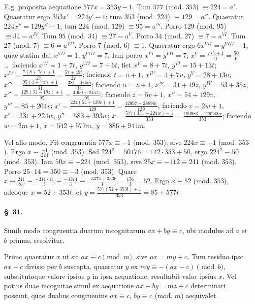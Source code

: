 \documentclass[12pt,a4paper]{article}
\theoremstyle{plain}
\theoremstyle{definition}
\theoremstyle{remark}
\newcommand{\art}[1]{\paragraph{\S\ #1.}}
\begin{document}
E.g. proposita aequatione $577x = 353y - 1$. Tum $577$ (mod. $353$) $\equiv 224 = a'$. Quaeratur ergo $353x' = 224y' - 1$; tum $353$ (mod. $224$) $\equiv 129 = a''$. Quaeratur $224x'' = 129y'' - 1$; tum $224$ (mod. $129$) $\equiv 95 = a'''$. Porro $129$ (mod. $95$) $\equiv 34 = a^{IV}$. Tum $95$ (mod. $34$) $\equiv 27 = a^V$. Porro $34$ (mod. $27$) $\equiv 7 = a^{VI}$. Tum $27$ (mod. $7$) $\equiv 6 = a^{VII}$. Porro $7$ (mod. $6$) $\equiv 1$. Quaeratur ergo $6x^{VII} = y^{VIII} - 1$, quae statim dat $x^{VII} = 1$, $y^{VIII} = 7$. Iam porro $x^{VI} = y^{VII} = 7$; $x^V = \frac{7 \cdot 7 + 1}{6} = \frac{50}{6}$ \ldots\ faciendo $x^{VI} = 1 + 7t$, $y^{VII} = 7 + 6t$, fiet $x^V = 8 + 7t$, $y^{VI} = 15 + 13t$; $x^{IV} = \frac{7(8+7t)+1}{27} = \frac{57+49t}{27}$; faciendo $t = u + 1$, $x^{IV} = 4 + 7u$, $y^V = 28 + 13u$; $x''' = \frac{95(4+7u)+1}{34} = \frac{381+665u}{34}$; faciendo $u = z + 1$, $x''' = 31 + 19z$, $y^{IV} = 53 + 35z$; $x'' = \frac{129(31+19z)+1}{95} = \frac{4000+2451z}{95}$; faciendo $z = 5v + 1$, $x'' = 54 + 129v$, $y''' = 85 + 204v$; $x' = \frac{224(54+129v)+1}{129} = \frac{12097+28896v}{129}$; faciendo $v = 2w + 1$, $x' = 331 + 224w$, $y'' = 583 + 393w$; $x = \frac{577(331+224w)-1}{353} = \frac{190986+129248w}{353}$; faciendo $w = 2m + 1$, $x = 542 + 577m$, $y = 886 + 941m$.

Vel alio modo. Fit congruentia $577x \equiv -1$ (mod. $353$), sive $224x \equiv -1$ (mod. $353$). Ergo $x \equiv \frac{-1}{224}$ (mod. $353$). Sed $224^2 = 50176 = 142 \cdot 353 + 50$, ergo $224^2 \equiv 50$ (mod. $353$). Iam $50x \equiv -224$ (mod. $353$), sive $25x \equiv -112 \equiv 241$ (mod. $353$). Porro $25 \cdot 14 = 350 \equiv -3$ (mod. $353$). Quare $x \equiv \frac{241}{25} \equiv \frac{-241 \cdot 14}{3} \equiv \frac{-3374}{3} \equiv \frac{-3374 + 3530}{3} = \frac{156}{3} = 52$. Ergo $x \equiv 52$ (mod. $353$), adeoque $x = 52 + 353t$, et $y = \frac{577(52+353t)+1}{353} = 85 + 577t$.

\art{31}
Simili modo congruentia duarum incognitarum $ax + by \equiv c$, ubi modulus ad $a$ et $b$ primus, resolvitur.

Primo quaeratur $x$ ut sit $ax \equiv c \pmod{m}$, sive $ax = my + c$. Tum residuo ipso $ax - c$ divisio per $b$ suscepta, quaeratur $y$ ex $my \equiv -(ax-c) \pmod{b}$, substitutoque valore ipsius $y$ in ipsa aequatione, resultabit valor ipsius $x$. Vel potius duae incognitae simul ex aequatione $ax + by = mz + c$ determinari possunt, quae duabus congruentiis $ax \equiv c$, $by \equiv c$ (mod. $m$) aequivalet.
\end{document}
